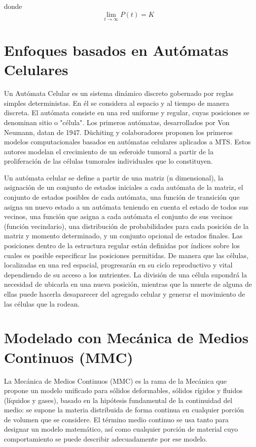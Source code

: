 donde 
\begin{equation}
    \lim_{t \to \infty} P(t) = K
\end{equation}

\section{Enfoques basados en Autómatas Celulares}
Un Autómata Celular es un sistema dinámico discreto gobernado por reglas simples deterministas. En él se considera al espacio y al tiempo de manera discreta. El autómata consiste en una red uniforme y regular, cuyas posiciones se denominan sitio o "célula". Los primeros autómatas, desarrollados por Von Neumann, datan de 1947. D\"uchiting y colaboradores proponen los primeros modelos computacionales basados en autómatas celulares aplicados a MTS. Estos autores modelan el crecimiento de un esferoide tumoral a partir de la proliferación de las células tumorales individuales que lo constituyen.

Un autómata celular se define a partir de una matriz (n dimensional), la asignación de un conjunto de estados iniciales a cada autómata de la matriz, el conjunto de estados posibles de cada autómata, una función de transición que asigna un nuevo estado a un autómata teniendo en cuenta el estado de todos sus vecinos, una función que asigna a cada autómata el conjunto de sus vecinos (función vecindario), una distribución de probabilidades para cada posición de la matriz y momento determinado, y un conjunto opcional de estados finales. Las posiciones dentro de la estructura regular están definidas por índices sobre los cuales es posible especificar las posiciones permitidas. De manera que las células, localizadas en una red espacial, progresarán en su ciclo reproductivo y vital dependiendo de su acceso a los nutrientes. La división de una célula supondrá la necesidad de ubicarla en una nueva posición, mientras que la muerte de alguna de ellas puede hacerla desaparecer del agregado celular y generar el movimiento de las células que la rodean.

\section{Modelado con Mecánica de Medios Continuos (MMC)}
La Mecánica de Medios Continuos (MMC) es la rama de la Mecánica que propone un modelo unificado para sólidos deformables, sólidos rígidos y fluidos (líquidos y gases), basado en la hipótesis fundamental de la continuidad del medio: se supone la materia distribuida de forma continua en cualquier porción de volumen que se considere. El término medio continuo se usa tanto para designar un modelo matemático, así como cualquier porción de material cuyo comportamiento se puede describir adecuadamente por ese modelo.

